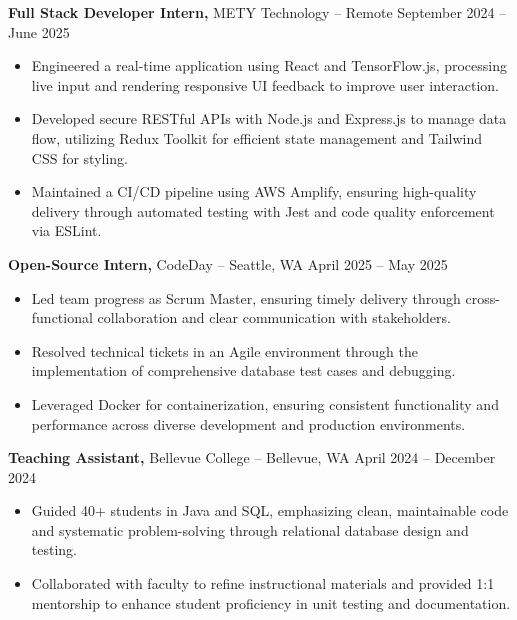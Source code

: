 \documentclass[11pt]{article}       %
\begin{document}
\textbf{Full Stack Developer Intern,} {METY Technology} -- Remote \hfill September 2024 -- June 2025 
\vspace{-9pt}
\begin{itemize}
  \item Engineered a real-time application using React and TensorFlow.js, processing live input and rendering responsive UI feedback to improve user interaction.
  \item Developed secure RESTful APIs with Node.js and Express.js to manage data flow, utilizing Redux Toolkit for efficient state management and Tailwind CSS for styling.
  \item Maintained a CI/CD pipeline using AWS Amplify, ensuring high-quality delivery through automated testing with Jest and code quality enforcement via ESLint.
\end{itemize}

\textbf{Open-Source Intern,} {CodeDay} -- Seattle, WA \hfill April 2025 -- May 2025 \\
\vspace{-9pt}
\begin{itemize}
  \item Led team progress as Scrum Master, ensuring timely delivery through cross-functional collaboration and clear communication with stakeholders.
  \item Resolved technical tickets in an Agile environment through the implementation of comprehensive database test cases and debugging.
  \item Leveraged Docker for containerization, ensuring consistent functionality and performance across diverse development and production environments.
\end{itemize}

\textbf{Teaching Assistant,} {Bellevue College} -- Bellevue, WA \hfill April 2024 -- December 2024 \\
\vspace{-9pt}
\begin{itemize}
  \item Guided 40+ students in Java and SQL, emphasizing clean, maintainable code and systematic problem-solving through relational database design and testing.
  \item Collaborated with faculty to refine instructional materials and provided 1:1 mentorship to enhance student proficiency in unit testing and documentation.
\end{itemize}
\end{document}
